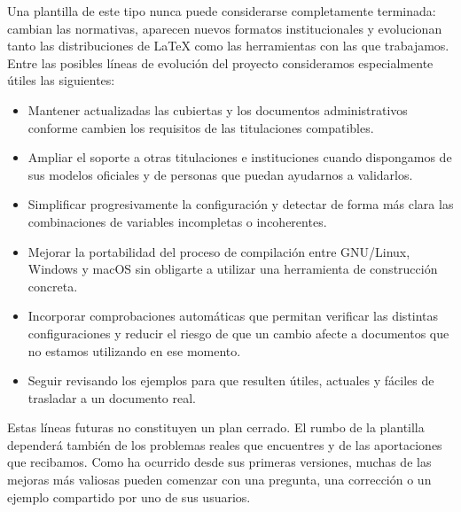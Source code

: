 Una plantilla de este tipo nunca puede considerarse completamente terminada: cambian las normativas, aparecen nuevos formatos institucionales y evolucionan tanto las distribuciones de \LaTeX{} como las herramientas con las que trabajamos. Entre las posibles líneas de evolución del proyecto consideramos especialmente útiles las siguientes:

\begin{itemize}
  \item Mantener actualizadas las cubiertas y los documentos administrativos conforme cambien los requisitos de las titulaciones compatibles.
  \item Ampliar el soporte a otras titulaciones e instituciones cuando dispongamos de sus modelos oficiales y de personas que puedan ayudarnos a validarlos.
  \item Simplificar progresivamente la configuración y detectar de forma más clara las combinaciones de variables incompletas o incoherentes.
  \item Mejorar la portabilidad del proceso de compilación entre GNU/Linux, Windows y macOS sin obligarte a utilizar una herramienta de construcción concreta.
  \item Incorporar comprobaciones automáticas que permitan verificar las distintas configuraciones y reducir el riesgo de que un cambio afecte a documentos que no estamos utilizando en ese momento.
  \item Seguir revisando los ejemplos para que resulten útiles, actuales y fáciles de trasladar a un documento real.
\end{itemize}

Estas líneas futuras no constituyen un plan cerrado. El rumbo de la plantilla dependerá también de los problemas reales que encuentres y de las aportaciones que recibamos. Como ha ocurrido desde sus primeras versiones, muchas de las mejoras más valiosas pueden comenzar con una pregunta, una corrección o un ejemplo compartido por uno de sus usuarios.

